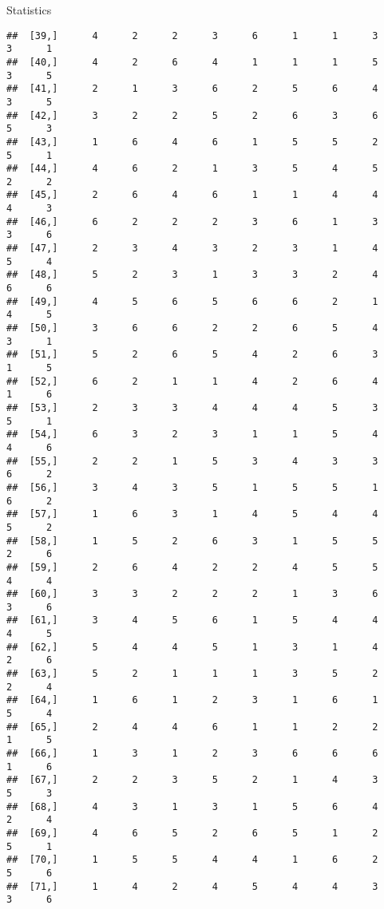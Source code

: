 \documentclass[
  ignorenonframetext,
]{beamer}
\begin{document}
\begin{frame}[fragile]{Statistics}
\begin{verbatim}
##  [39,]      4      2      2      3      6      1      1      3      3      1
##  [40,]      4      2      6      4      1      1      1      5      3      5
##  [41,]      2      1      3      6      2      5      6      4      3      5
##  [42,]      3      2      2      5      2      6      3      6      5      3
##  [43,]      1      6      4      6      1      5      5      2      5      1
##  [44,]      4      6      2      1      3      5      4      5      2      2
##  [45,]      2      6      4      6      1      1      4      4      4      3
##  [46,]      6      2      2      2      3      6      1      3      3      6
##  [47,]      2      3      4      3      2      3      1      4      5      4
##  [48,]      5      2      3      1      3      3      2      4      6      6
##  [49,]      4      5      6      5      6      6      2      1      4      5
##  [50,]      3      6      6      2      2      6      5      4      3      1
##  [51,]      5      2      6      5      4      2      6      3      1      5
##  [52,]      6      2      1      1      4      2      6      4      1      6
##  [53,]      2      3      3      4      4      4      5      3      5      1
##  [54,]      6      3      2      3      1      1      5      4      4      6
##  [55,]      2      2      1      5      3      4      3      3      6      2
##  [56,]      3      4      3      5      1      5      5      1      6      2
##  [57,]      1      6      3      1      4      5      4      4      5      2
##  [58,]      1      5      2      6      3      1      5      5      2      6
##  [59,]      2      6      4      2      2      4      5      5      4      4
##  [60,]      3      3      2      2      2      1      3      6      3      6
##  [61,]      3      4      5      6      1      5      4      4      4      5
##  [62,]      5      4      4      5      1      3      1      4      2      6
##  [63,]      5      2      1      1      1      3      5      2      2      4
##  [64,]      1      6      1      2      3      1      6      1      5      4
##  [65,]      2      4      4      6      1      1      2      2      1      5
##  [66,]      1      3      1      2      3      6      6      6      1      6
##  [67,]      2      2      3      5      2      1      4      3      5      3
##  [68,]      4      3      1      3      1      5      6      4      2      4
##  [69,]      4      6      5      2      6      5      1      2      5      1
##  [70,]      1      5      5      4      4      1      6      2      5      6
##  [71,]      1      4      2      4      5      4      4      3      3      6

\end{verbatim}
\end{frame}
\end{document}

